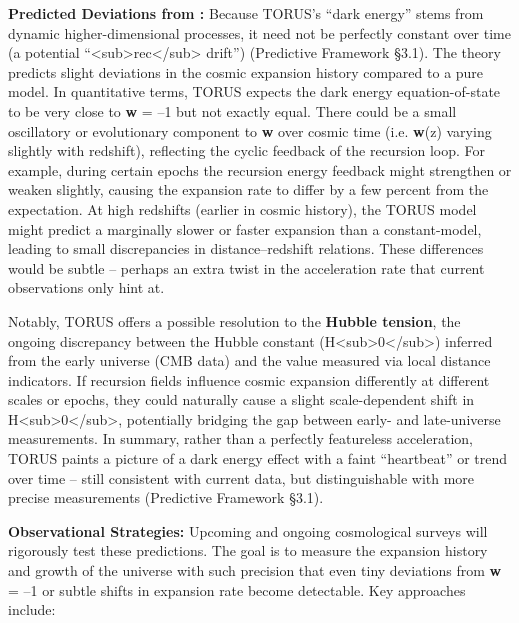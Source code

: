 \documentclass[
]{article}
\begin{document}
\textbf{Predicted Deviations from \LambdaCDM:} Because TORUS's ``dark energy''
stems from dynamic higher-dimensional processes, it need not be
perfectly constant over time (a potential
``\Lambda\textless sub\textgreater rec\textless/sub\textgreater{} drift'')
(Predictive Framework §3.1). The theory predicts slight deviations in
the cosmic expansion history compared to a pure \LambdaCDM model. In
quantitative terms, TORUS expects the dark energy equation-of-state to
be very close to \textbf{w} = --1 but not exactly equal. There could be
a small oscillatory or evolutionary component to \textbf{w} over cosmic
time (i.e. \textbf{w}(z) varying slightly with redshift), reflecting the
cyclic feedback of the recursion loop. For example, during certain
epochs the recursion energy feedback might strengthen or weaken
slightly, causing the expansion rate to differ by a few percent from the
\LambdaCDM expectation. At high redshifts (earlier in cosmic history), the
TORUS model might predict a marginally slower or faster expansion than a
constant-\Lambda model, leading to small discrepancies in distance--redshift
relations. These differences would be subtle -- perhaps an extra twist
in the acceleration rate that current observations only hint at.

Notably, TORUS offers a possible resolution to the \textbf{Hubble
tension}, the ongoing discrepancy between the Hubble constant
(H\textless sub\textgreater0\textless/sub\textgreater) inferred from the
early universe (CMB data) and the value measured via local distance
indicators. If recursion fields influence cosmic expansion differently
at different scales or epochs, they could naturally cause a slight
scale-dependent shift in
H\textless sub\textgreater0\textless/sub\textgreater, potentially
bridging the gap between early- and late-universe measurements. In
summary, rather than a perfectly featureless acceleration, TORUS paints
a picture of a dark energy effect with a faint ``heartbeat'' or trend
over time -- still consistent with current data, but distinguishable
with more precise measurements (Predictive Framework §3.1).

\textbf{Observational Strategies:} Upcoming and ongoing cosmological
surveys will rigorously test these predictions. The goal is to measure
the expansion history and growth of the universe with such precision
that even tiny deviations from \textbf{w} = --1 or subtle shifts in
expansion rate become detectable. Key approaches include:
\end{document}
